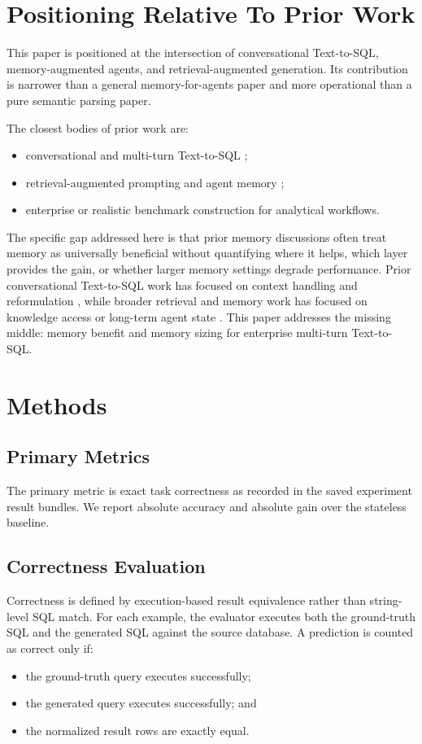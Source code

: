 \documentclass[11pt]{article}
\begin{document}
\section{Positioning Relative To Prior Work}
This paper is positioned at the intersection of conversational Text-to-SQL, memory-augmented agents, and retrieval-augmented generation. Its contribution is narrower than a general memory-for-agents paper and more operational than a pure semantic parsing paper.

The closest bodies of prior work are:
\begin{itemize}[leftmargin=1.5em]
  \item conversational and multi-turn Text-to-SQL \cite{yu2019sparc,yu2019cosql,liu2022cqrsql};
  \item retrieval-augmented prompting and agent memory \cite{lewis2020rag,mem0};
  \item enterprise or realistic benchmark construction for analytical workflows.
\end{itemize}

The specific gap addressed here is that prior memory discussions often treat memory as universally beneficial without quantifying where it helps, which layer provides the gain, or whether larger memory settings degrade performance. Prior conversational Text-to-SQL work has focused on context handling and reformulation \cite{yu2019sparc,yu2019cosql,liu2022cqrsql}, while broader retrieval and memory work has focused on knowledge access or long-term agent state \cite{lewis2020rag,mem0}. This paper addresses the missing middle: memory benefit and memory sizing for enterprise multi-turn Text-to-SQL.

\section{Methods}
\subsection{Primary Metrics}
The primary metric is exact task correctness as recorded in the saved experiment result bundles. We report absolute accuracy and absolute gain over the stateless baseline.

\subsection{Correctness Evaluation}
Correctness is defined by execution-based result equivalence rather than string-level SQL match. For each example, the evaluator executes both the ground-truth SQL and the generated SQL against the source database. A prediction is counted as correct only if:
\begin{itemize}[leftmargin=1.5em]
  \item the ground-truth query executes successfully;
  \item the generated query executes successfully; and
  \item the normalized result rows are exactly equal.
\end{itemize}
\end{document}
